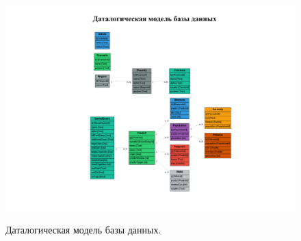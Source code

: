 \begin{figure}[!h]
\centering
\includegraphics[width=\textwidth]{design/ramkaless/4.png}
\label{figure:datalogModel}
\caption{Даталогическая модель базы данных.}
\end{figure}

\clearpage
{}


